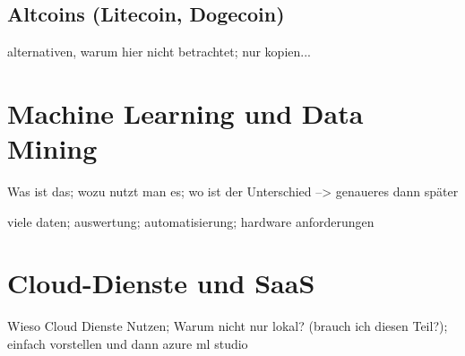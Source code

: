 \subsection{Altcoins (Litecoin, Dogecoin)}\label{subsec:Altcoins}
alternativen, warum hier nicht betrachtet; nur kopien...




\section{Machine Learning und Data Mining}
Was ist das; wozu nutzt man es; wo ist der Unterschied --> genaueres dann später

viele daten; auswertung; automatisierung; hardware anforderungen


\section{Cloud-Dienste und SaaS}
Wieso Cloud Dienste Nutzen; Warum nicht nur lokal? (brauch ich diesen Teil?); einfach vorstellen und dann azure ml studio